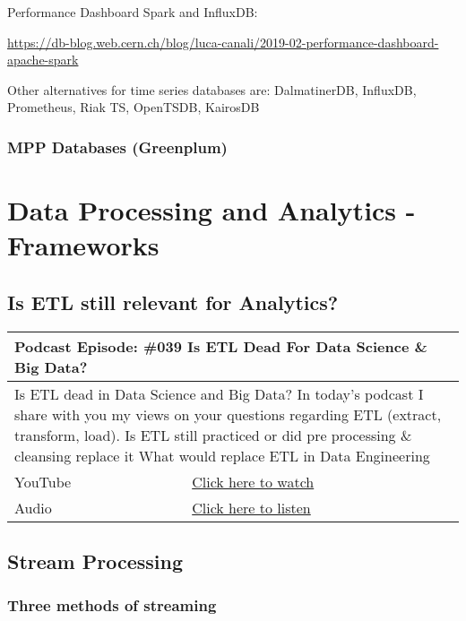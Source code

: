 \documentclass[12pt, numbers=noenddot]{scrreprt} %
\begin{document}
Performance Dashboard Spark and InfluxDB:

\url{https://db-blog.web.cern.ch/blog/luca-canali/2019-02-performance-dashboard-apache-spark}

Other alternatives for time series databases are: DalmatinerDB, InfluxDB, Prometheus, Riak TS, OpenTSDB, KairosDB
 

\subsection{MPP Databases (Greenplum)}


\chapter{Data Processing and Analytics - Frameworks}

\section{Is ETL still relevant for Analytics?}

\begin{table}[h]
\begin{tabular}{ll}
\hline
\multicolumn{2}{l}{\textbf{Podcast Episode:} \#039 Is ETL Dead For Data Science \& Big Data?} \\ \hline
\multicolumn{2}{p{15cm}}{Is ETL dead in Data Science and Big Data? In today's podcast I share with you my views on your questions regarding ETL (extract, transform, load). Is ETL still practiced or did pre processing \& cleansing replace it What would replace ETL in Data Engineering}         \\ \hline
\multicolumn{1}{l|}{YouTube}   & \href{https://youtu.be/leSOWPaNkl4}{Click here to watch}   \\ 
\multicolumn{1}{l|}{Audio}     & \href{https://anchor.fm/andreaskayy/episodes/Is-ETL-Dead-For-Data-Science--Big-Data---PoDS-039-e2b604}{Click here to listen}   \\ \hline
\end{tabular}
\end{table}


\section{Stream Processing}
\subsection{Three methods of streaming}
\end{document}
